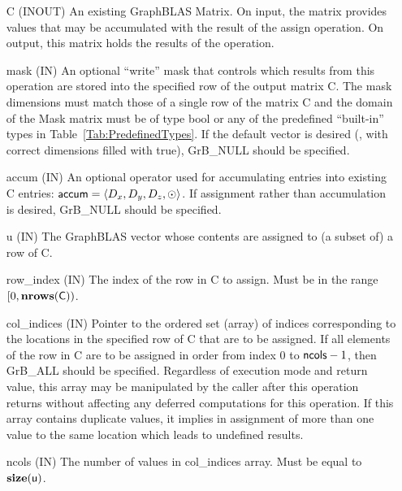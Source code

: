 \begin{itemize}[leftmargin=1.1in]
    \item[{\sf C}]    ({\sf INOUT}) An existing GraphBLAS Matrix.  On input,
    the matrix provides values that may be accumulated with the result of the
    assign operation.  On output, this matrix holds the results of the
    operation.

    \item[{\sf mask}] ({\sf IN}) An optional ``write'' mask that controls which
    results from this operation are stored into the specified row of the output matrix {\sf C}. The 
    mask dimensions must match those of a single row of the matrix {\sf C} and the domain of the 
    {\sf Mask} matrix must be of type {\sf bool} or any of the predefined 
    ``built-in'' types in Table~\ref{Tab:PredefinedTypes}.  If the default
    vector is desired (\ie, with correct dimensions filled with {\sf true}), 
    {\sf GrB\_NULL} should be specified.
    
    \item[{\sf accum}]    ({\sf IN}) An optional operator used for accumulating
    entries into existing {\sf C} entries: ${\sf accum} = \langle D_x,
    D_y, D_z,\odot \rangle$. If assignment rather than accumulation is
    desired, {\sf GrB\_NULL} should be specified.

    \item[{\sf u}]       ({\sf IN}) The GraphBLAS vector whose contents are 
    assigned to (a subset of) a row of {\sf C}.

    \item[{\sf row\_index}]  ({\sf IN}) The index of the row in {\sf C} to 
    assign. Must be in the range $[0, \bold{nrows}({\sf C}))$.

    \item[{\sf col\_indices}]  ({\sf IN}) Pointer to the ordered set (array) of 
    indices corresponding to the locations in the specified row of {\sf C} 
    that are to be assigned.  If all elements of the row in {\sf C} are to be 
    assigned in order from index $0$ to ${\sf ncols} - 1$, then {\sf GrB\_ALL} should be 
    specified.  Regardless of execution mode and return value, this array may be
    manipulated by the caller after this operation returns without affecting any 
    deferred computations for this operation.
    If this array contains duplicate values, it implies in assignment of more 
    than one value to the same location which leads to undefined results.
    
    \item[{\sf ncols}] ({\sf IN}) The number of values in {\sf col\_indices} array.
    Must be equal to $\bold{size}({\sf u})$.


\end{itemize}
